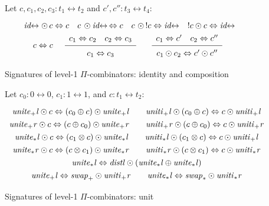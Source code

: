 \documentclass{article}
\newcommand{\identlp}{\mathit{unite}_+\mathit{l}}
\newcommand{\identrp}{\mathit{uniti}_+\mathit{l}}
\newcommand{\identlsp}{\mathit{unite}_+\mathit{r}}
\newcommand{\identrsp}{\mathit{uniti}_+\mathit{r}}
\newcommand{\swapp}{\mathit{swap}_+}
\newcommand{\identlt}{\mathit{unite}_*\mathit{l}}
\newcommand{\identrt}{\mathit{uniti}_*\mathit{l}}
\newcommand{\identlst}{\mathit{unite}_*\mathit{r}}
\newcommand{\identrst}{\mathit{uniti}_*\mathit{r}}
\newcommand{\swapt}{\mathit{swap}_*}
\newcommand{\distl}{\mathit{distl}}
\newcommand{\idc}{\mathit{id}\!\!\leftrightarrow}
\newcommand{\Rule}[4]{
\makebox{{\rm #1}
$\displaystyle
\frac{\begin{array}{l}#2 \\\end{array}}
{\begin{array}{l}#3      \\\end{array}}$
 #4}}
\begin{document}
\begin{figure}[t]
Let $c, c_1, c_2, c_3 : t_1 \leftrightarrow t_2$ and $c', c'' : t_3 \leftrightarrow t_4$:
\[\def\arraystretch{1.3}
\begin{array}{c}
  {\idc \odot \, c \Leftrightarrow c}
\quad
  {c \, \odot \idc \, \Leftrightarrow c}
\quad
  {c\,\, \odot\,! c \Leftrightarrow \idc}
\quad
  {! c \odot c \Leftrightarrow \idc}
\\
  {c \Leftrightarrow c}
\quad
\Rule{}
  {c_1 \Leftrightarrow c_2 \quad c_2 \Leftrightarrow c_3}
  {c_1 \Leftrightarrow c_3}
  {}
\quad
\Rule{}
  {c_1 \Leftrightarrow c' \quad c_2 \Leftrightarrow c''}
  {c_1 \odot c_2 \Leftrightarrow c' \odot c''}
  {}
\end{array}\]
\caption{\label{figh}Signatures of level-1 $\Pi$-combinators: identity and composition}
\end{figure}

\begin{figure}[t]
Let $c_0 : 0 \leftrightarrow 0$, $c_1 : 1 \leftrightarrow 1$, and $c : t_1 \leftrightarrow t_2$:
\[\def\arraystretch{1.3}
\begin{array}{c}
  {\identlp \odot c \Leftrightarrow (c_0 \oplus c) \odot \identlp}
\qquad
  {\identrp \odot (c_0 \oplus c) \Leftrightarrow c \odot \identrp}
\\
  {\identlsp \odot c \Leftrightarrow (c \oplus c_0) \odot \identlsp}
\qquad
  {\identrsp \odot (c \oplus c_0) \Leftrightarrow c \odot \identrsp}
\\
  {\identlt \odot c \Leftrightarrow (c_1 \otimes c) \odot \identlt}
\qquad
  {\identrt \odot (c_1 \otimes c) \Leftrightarrow c \odot \identrp}
\\
  {\identlst \odot c \Leftrightarrow (c \otimes c_1) \odot \identlst}
\qquad
  {\identrst \odot (c \otimes c_1) \Leftrightarrow c \odot \identrst}
\\
  {\identlt \Leftrightarrow \distl \odot (\identlt \oplus \identlt)}
\\
\identlp \Leftrightarrow \swapp \odot \identrsp
\qquad
\identlt \Leftrightarrow \swapt \odot \identrst
\end{array}\]
\caption{\label{figg}Signatures of level-1 $\Pi$-combinators: unit}
\end{figure}
\end{document}
